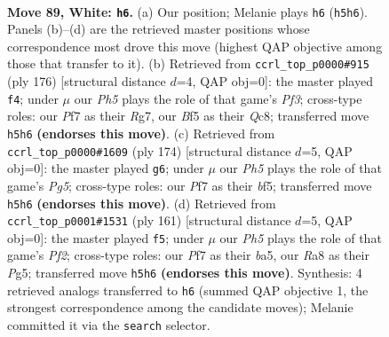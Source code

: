 \documentclass[11pt]{article}
\begin{document}
\clearpage

\begin{figure}[p]\centering
\begin{subfigure}{0.46\textwidth}\centering
\resizebox{\linewidth}{!}{%
\newchessgame
\chessboard[
  setfen={R7/5P2/8/3k1B1P/8/8/8/7K w - - 9 89},
  showmover=false,
  pgfstyle=straightmove, color=movearrow, markmove={h5-h6}
]}
\caption{}
\end{subfigure}\hfill
\begin{subfigure}{0.46\textwidth}\centering
\resizebox{\linewidth}{!}{%
\newchessgame
\chessboard[
  setfen={2Q5/6R1/8/k7/8/3K1P2/8/8 w - - 1 89},
  showmover=false,
  pgfstyle=straightmove, color=movearrow, markmove={f3-f4}
]}
\caption{}
\end{subfigure}
\\[4pt]
\begin{subfigure}{0.46\textwidth}\centering
\resizebox{\linewidth}{!}{%
\newchessgame
\chessboard[
  setfen={4k3/6B1/8/5bP1/8/8/8/2K5 w - - 7 88},
  showmover=false,
  pgfstyle=straightmove, color=movearrow, markmove={g5-g6}
]}
\caption{}
\end{subfigure}\hfill
\begin{subfigure}{0.46\textwidth}\centering
\resizebox{\linewidth}{!}{%
\newchessgame
\chessboard[
  setfen={8/5p2/8/B2k2p1/6P1/8/8/K7 b - - 5 81},
  showmover=false,
  pgfstyle=straightmove, color=movearrow, markmove={f7-f5}
]}
\caption{}
\end{subfigure}
\caption{\textbf{Move 89, White: \texttt{h6}.} (a) Our position; Melanie plays \texttt{h6} (\texttt{h5h6}). Panels (b)--(d) are the retrieved master positions whose correspondence most drove this move (highest QAP objective among those that transfer to it). (b) Retrieved from \texttt{ccrl\_top\_p0000\#915} (ply 176) [structural distance $d$=4, QAP obj=0]: the master played \texttt{f4}; under $\mu$ our \emph{Ph5} plays the role of that game's \emph{Pf3}; cross-type roles: our \emph{P}f7 as their \emph{R}g7, our \emph{B}f5 as their \emph{Q}c8; transferred move \texttt{h5h6} \textbf{(endorses this move)}. (c) Retrieved from \texttt{ccrl\_top\_p0000\#1609} (ply 174) [structural distance $d$=5, QAP obj=0]: the master played \texttt{g6}; under $\mu$ our \emph{Ph5} plays the role of that game's \emph{Pg5}; cross-type roles: our \emph{P}f7 as their \emph{b}f5; transferred move \texttt{h5h6} \textbf{(endorses this move)}. (d) Retrieved from \texttt{ccrl\_top\_p0001\#1531} (ply 161) [structural distance $d$=5, QAP obj=0]: the master played \texttt{f5}; under $\mu$ our \emph{Ph5} plays the role of that game's \emph{Pf2}; cross-type roles: our \emph{P}f7 as their \emph{b}a5, our \emph{R}a8 as their \emph{P}g5; transferred move \texttt{h5h6} \textbf{(endorses this move)}. Synthesis: 4 retrieved analogs transferred to \texttt{h6} (summed QAP objective 1, the strongest correspondence among the candidate moves); Melanie committed it via the \texttt{search} selector.}
\label{fig:thought-m176}
\end{figure}
\end{document}
